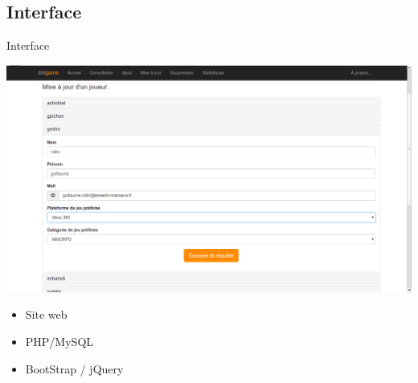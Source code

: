 \documentclass{beamer}
\begin{document}


\subsection{Interface}
\begin{frame}
\begin{block}{Interface}
\begin{center}
\includegraphics[scale=0.20]{capture2.png}
\end{center}
\begin{itemize}
\item Site web
\item PHP/MySQL
\item BootStrap / jQuery
\end{itemize}
\end{block}
\end{frame}
\end{document}
